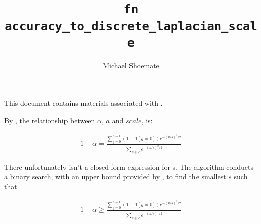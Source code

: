 \documentclass{article}
\title{\texttt{fn accuracy\_to\_discrete\_laplacian\_scale}}
\author{Michael Shoemate}
\begin{document}
\maketitle

This document contains materials associated with .

By , 
the relationship between $\alpha$, $a$ and $scale$, is:

\begin{align*}
    1 - \alpha = \frac{\sum_{y=0}^{a - 1} (1 + 1[y = 0]) e^{-(y/s)^2/2}}{\sum_{z \in \mathbb{Z}} e^{-(z/s)^2/2}}
\end{align*}

There unfortunately isn't a closed-form expression for s.
The algorithm conducts a binary search, 
with an upper bound provided by , 
to find the smallest $s$ such that

\begin{align*}
    1 - \alpha \ge \frac{\sum_{y=0}^{a - 1} (1 + 1[y = 0]) e^{-(y/s)^2/2}}{\sum_{z \in \mathbb{Z}} e^{-(z/s)^2/2}}
\end{align*}
\end{document}
